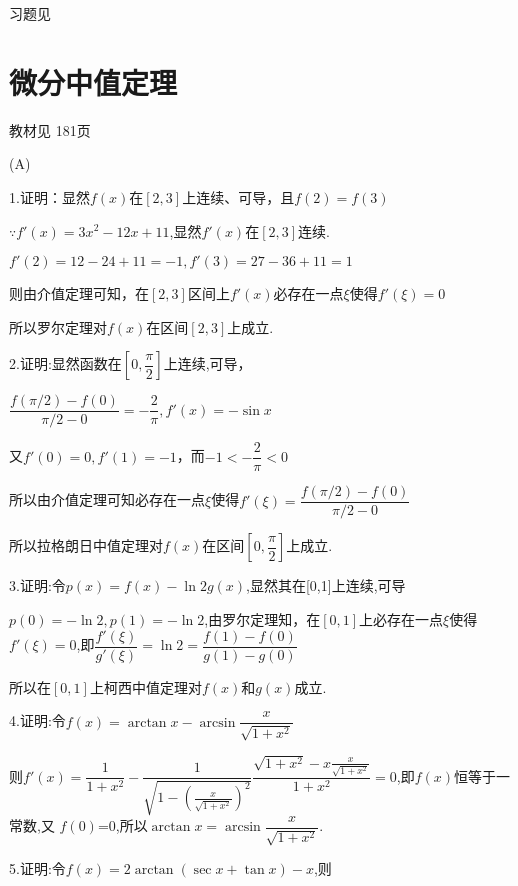 \begin{flushright}
  \color{zhanqing!80}
   习题见
\end{flushright}

\section{微分中值定理}
\begin{flushright}
  \color{zhanqing!80}
   教材见 181页 %
\end{flushright}
(A)

1.证明：显然$f(x)$在$[2,3]$上连续、可导，且$f(2)=f(3)$

$\because f'(x) = 3{x^2} - 12x + 11$,显然$f'(x)$在$[2,3]$连续.

$f'(2) = 12 - 24 + 11 =  - 1,f'(3) = 27 - 36 + 11 = 1$

则由介值定理可知，在$[2,3]$区间上$f'(x)$必存在一点$\xi $使得$f'(\xi ) = 0$

所以罗尔定理对$f(x)$在区间$[2,3]$上成立.

2.证明:显然函数在$[0,\dfrac{\pi }{2}]$上连续,可导，

$\dfrac{{f(\pi /2) - f(0)}}{{\pi /2 - 0}} =  - \dfrac{2}{\pi },f'(x) =  - \sin x$

又$f'(0) = 0,f'(1) =  - 1$，而$- 1 < - \dfrac{2}{\pi } < 0$

所以由介值定理可知必存在一点$ \xi $使得$f'(\xi ) = \dfrac{{f(\pi /2) - f(0)}}{{\pi /2 - 0}}$

所以拉格朗日中值定理对$f(x)$在区间$[0,\dfrac{\pi }{2}]$上成立.

3.证明:令$p(x) = f(x) - \ln 2g(x)$,显然其在[0,1]上连续,可导

$p(0) =  - \ln 2,p(1) =  - \ln 2$,由罗尔定理知，在$[0,1]$上必存在一点$\xi$使得$f'(\xi ) = 0$,即$\dfrac{{f'(\xi )}}{{g'(\xi )}} = \ln 2 = \dfrac{{f(1) - f(0)}}{{g(1) - g(0)}}$

所以在$[0,1]$上柯西中值定理对$f(x)$和$g(x)$成立.

4.证明:令$f(x) = \arctan x - \arcsin \dfrac{x}{{\sqrt {1 + {x^2}} }}$

则$f'(x) = \dfrac{1}{{1 + {x^2}}} - \dfrac{1}{{\sqrt {1 - {{(\frac{x}{{\sqrt {1 + {x^2}} }})}^2}} }}\dfrac{{\sqrt {1 + {x^2}}  - x\frac{x}{{\sqrt {1 + {x^2}} }}}}{{1 + {x^2}}} = 0$,即$f(x)$恒等于一常数,又
$f(0)$=0,所以$\arctan x = \arcsin \dfrac{x}{{\sqrt {1 + {x^2}} }}$.

5.证明:令$f(x) = 2\arctan (\sec x + \tan x) - x$,则

